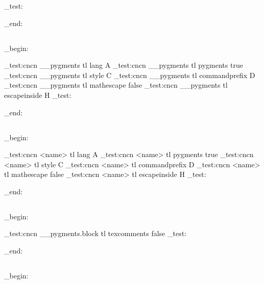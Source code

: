 \CDR_test:

\group_end:
\ExplSyntaxOff

\subsection{}
\ExplSyntaxOn
\group_begin:


\CDR_test:cncn { __pygments } { tl } { lang } { A }
\CDR_test:cncn { __pygments } { tl } { pygments } { true }
\CDR_test:cncn { __pygments } { tl } { style } { C }
\CDR_test:cncn { __pygments } { tl } { commandprefix } { D }
\CDR_test:cncn { __pygments } { tl } { mathescape } { false }
\CDR_test:cncn { __pygments } { tl } { escapeinside } { H }
\CDR_test:

\group_end:
\ExplSyntaxOff

\subsection{}
\ExplSyntaxOn
\group_begin:


\CDR_test:cncn { <name> } { tl } { lang } { A }
\CDR_test:cncn { <name> } { tl } { pygments } { true }
\CDR_test:cncn { <name> } { tl } { style } { C }
\CDR_test:cncn { <name> } { tl } { commandprefix } { D }
\CDR_test:cncn { <name> } { tl } { mathescape } { false }
\CDR_test:cncn { <name> } { tl } { escapeinside } { H }
\CDR_test:

\group_end:
\ExplSyntaxOff

\subsection{}
\ExplSyntaxOn
\group_begin:


\CDR_test:cncn { __pygments.block } { tl } { texcomments} { false }
\CDR_test:

\group_end:
\ExplSyntaxOff

\subsection{}
\ExplSyntaxOn
\group_begin:

